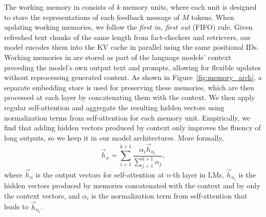 The working memory in \model consists of $k$ memory units, where each unit is designed to store the representations of each feedback message of $M$ tokens. 
When updating working memories, we follow the \textit{first in, first out} (FIFO) rule. 
Given refreshed text chunks of the same length from fact-checkers and retrievers, our model encodes them into the KV cache in parallel using the same positional IDs. Working memories in \model are stored as part of the language models' context preceding the model's own output text and prompts, allowing for flexible updates without reprocessing generated content. 
As shown in Figure~\ref{fig:memory_arch}, a separate embedding store is used for preserving these memories, which are then processed at each layer by concatenating them with the context. 
We then apply regular self-attention and aggregate the resulting hidden vectors using normalization terms from self-attention for each memory unit. Empirically, we find that adding hidden vectors produced by context only improves the fluency of long outputs, so we keep it in our model architectures. 
More formally, 
\begin{equation}
    \Vec{h}_n=\sum_{i=1}^{k+1}\frac{\alpha_i\Vec{h}_{n_i}}{\sum_{j=1}^{k+1}\alpha_j},
\end{equation}
\noindent where $\Vec{h}_n$ is the output vectors for self-attention at $n$-th layer in LMs, $\Vec{h}_{n_i}$ is the hidden vectors produced by memories concatenated with the context and by only the context vectors, and $\alpha_i$ is the normalization term from self-attention that leads to $\Vec{h}_{n_i}$.

